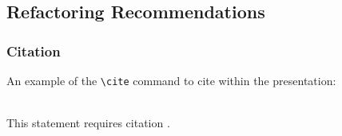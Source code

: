 \subsection{Refactoring Recommendations}

\begin{frame}[fragile] %
\frametitle{Citation}
An example of the \verb|\cite| command to cite within the presentation:\\~

This statement requires citation \cite{p1}.
\end{frame}



